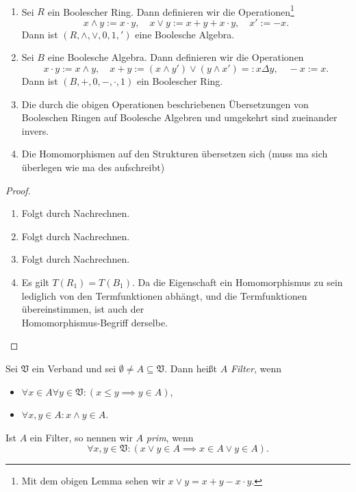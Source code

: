 \begin{proposition}{\ }
    \begin{enumerate}
        \item Sei $R$ ein Boolescher Ring. Dann definieren wir die Operationen\footnote{Mit dem obigen Lemma sehen wir $x \lor y = x + y - x \cdot y$.}
        $$ x \land y := x \cdot y, \quad x \lor y := x + y + x \cdot y, \quad x' := -x. $$
        Dann ist $(R, \land, \lor, 0, 1, ')$ eine Boolesche Algebra.

        \item Sei $B$ eine Boolesche Algebra. Dann definieren wir die Operationen
        $$ x \cdot y := x \land y, \quad x + y := (x \land y') \lor (y \land x') =: x \Delta y, \quad -x := x. $$
        Dann ist $(B, +, 0, -, \cdot, 1)$ ein Boolescher Ring.

        \item Die durch die obigen Operationen beschriebenen Übersetzungen von Booleschen Ringen auf Boolesche Algebren und umgekehrt sind zueinander invers.

        \item Die Homomorphismen auf den Strukturen übersetzen sich (muss ma sich überlegen wie ma des aufschreibt)
    \end{enumerate}
\end{proposition}

\begin{proof}{\ }
    \begin{enumerate}
        \item Folgt durch Nachrechnen.
        \item Folgt durch Nachrechnen.
        \item Folgt durch Nachrechnen.
        \item Es gilt $T(R_1) = T(B_1)$. Da die Eigenschaft ein Homomorphismus zu sein lediglich von den Termfunktionen abhängt, und die Termfunktionen übereinstimmen, ist auch der \\ Homomorphismus-Begriff derselbe.
    \end{enumerate}
\end{proof}

\begin{definition}
    Sei $\mathfrak{V}$ ein Verband und sei $\emptyset \neq A \subseteq \mathfrak{V}$. Dann heißt $A$ \emph{Filter}, wenn
    \begin{itemize}
        \item $\forall x \in A \forall y \in \mathfrak{V} : ( x \leq y \implies y \in A )$,
        \item $\forall x, y \in A : x \land y \in A$.
    \end{itemize}
    Ist $A$ ein Filter, so nennen wir $A$ \emph{prim}, wenn
    $$ \forall x ,y \in \mathfrak{V} : ( x \lor y \in A \implies x \in A \lor y \in A ). $$
    
\end{definition}

